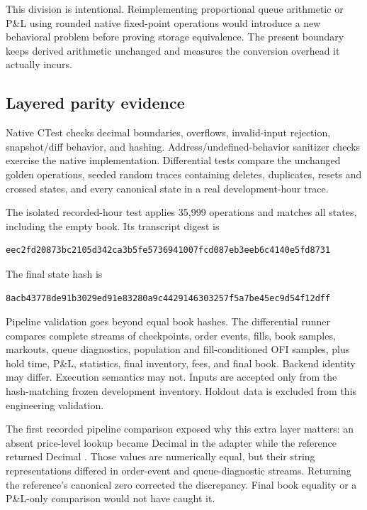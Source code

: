 This division is intentional. Reimplementing proportional queue arithmetic or
P\&L using rounded native fixed-point operations would introduce a new
behavioral problem before proving storage equivalence. The present boundary
keeps derived arithmetic unchanged and measures the conversion overhead it
actually incurs.

\subsection{Layered parity evidence}

Native CTest checks decimal boundaries, overflows, invalid-input rejection,
snapshot/diff behavior, and hashing. Address/undefined-behavior sanitizer
checks exercise the native implementation. Differential tests compare the
unchanged golden operations, seeded random traces containing deletes,
duplicates, resets and crossed states, and every canonical state in a real
development-hour trace.

The isolated recorded-hour test applies 35,999 operations and matches all
\NativeRecordedStates{} states, including the empty book. Its transcript
digest is
\begin{lstlisting}
eec2fd20873bc2105d342ca3b5fe5736941007fcd087eb3eeb6c4140e5fd8731
\end{lstlisting}
The final state hash is
\begin{lstlisting}
8acb43778de91b3029ed91e83280a9c4429146303257f5a7be45ec9d54f12dff
\end{lstlisting}

Pipeline validation goes beyond equal book hashes. The differential runner
compares complete streams of checkpoints, order events, fills, book samples,
markouts, queue diagnostics, population and fill-conditioned OFI samples, plus
hold time, P\&L, statistics, final inventory, fees, and final book. Backend
identity may differ. Execution semantics may not. Inputs are accepted only
from the hash-matching frozen development inventory. Holdout data is excluded
from this engineering validation.

The first recorded pipeline comparison exposed why this extra layer matters:
an absent price-level lookup became Decimal  in the adapter while
the reference returned Decimal . Those values are numerically equal,
but their string representations differed in order-event and queue-diagnostic
streams. Returning the reference's canonical zero corrected the discrepancy.
Final book equality or a P\&L-only comparison would not have caught it.

